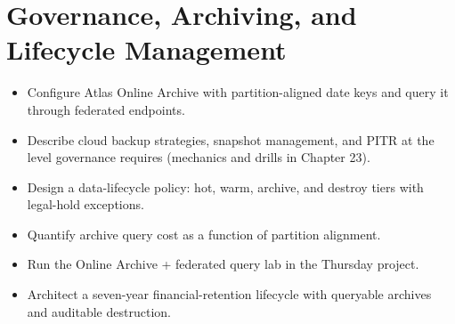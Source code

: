 \chapter{Governance, Archiving, and Lifecycle Management}
%

\begin{objectives}
\begin{itemize}
    \item Configure Atlas Online Archive with partition-aligned date keys and query it through federated endpoints.
    \item Describe cloud backup strategies, snapshot management, and PITR at the level governance requires (mechanics and drills in Chapter 23).
    \item Design a data-lifecycle policy: hot, warm, archive, and destroy tiers with legal-hold exceptions.
    \item Quantify archive query cost as a function of partition alignment.
    \item Run the Online Archive + federated query lab in the Thursday project.
    \item Architect a seven-year financial-retention lifecycle with queryable archives and auditable destruction.
\end{itemize}
\end{objectives}

